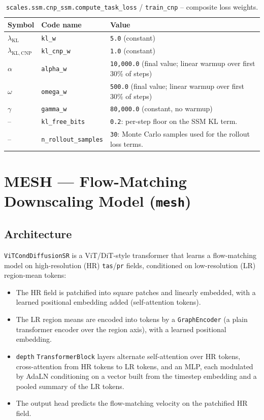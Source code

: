\documentclass[11pt]{article}
\begin{document}
\begin{table}[h]
\centering
\caption{\texttt{scales.ssm.cnp\_ssm.compute\_task\_loss} / \texttt{train\_cnp} -- composite loss weights.}
\begin{tabular}{@{}llL{7cm}@{}}
\toprule
Symbol & Code name & Value \\
\midrule
$\lambda_{\mathrm{KL}}$      & \texttt{kl\_w}     & \texttt{5.0} (constant) \\
$\lambda_{\mathrm{KL,CNP}}$  & \texttt{kl\_cnp\_w} & \texttt{1.0} (constant) \\
$\alpha$                     & \texttt{alpha\_w}  & \texttt{10{,}000.0} (final value; linear warmup over first 30\% of steps) \\
$\omega$                     & \texttt{omega\_w}  & \texttt{500.0} (final value; linear warmup over first 30\% of steps) \\
$\gamma$                     & \texttt{gamma\_w}  & \texttt{80{,}000.0} (constant, no warmup) \\
--                           & \texttt{kl\_free\_bits} & \texttt{0.2}: per-step floor on the SSM KL term. \\
--                           & \texttt{n\_rollout\_samples} & \texttt{30}: Monte Carlo samples used for the rollout loss terms. \\
\bottomrule
\end{tabular}
\end{table}

\clearpage
\section{MESH --- Flow-Matching Downscaling Model (\texttt{mesh})}

\subsection{Architecture}

\texttt{ViTCondDiffusionSR} is a ViT/DiT-style transformer that learns a
flow-matching model on high-resolution (HR) \texttt{tas}/\texttt{pr} fields,
conditioned on low-resolution (LR) region-mean tokens:

\begin{itemize}
  \item The HR field is patchified into square patches and linearly
    embedded, with a learned positional embedding added (self-attention
    tokens).
  \item The LR region means are encoded into tokens by a
    \texttt{GraphEncoder} (a plain transformer encoder over the region
    axis), with a learned positional embedding.
  \item \texttt{depth} \texttt{TransformerBlock} layers alternate
    self-attention over HR tokens, cross-attention from HR tokens to LR
    tokens, and an MLP, each modulated by AdaLN conditioning on a vector
    built from the timestep embedding and a pooled summary of the LR
    tokens.
  \item The output head predicts the flow-matching velocity on the
    patchified HR field.
\end{itemize}
\end{document}

